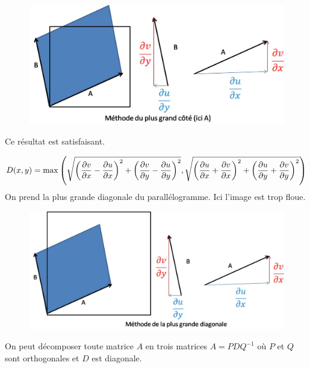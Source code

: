 \begin{figure}[h!]
\centering
\includegraphics[scale=0.5]{methode_plus_grand_cote.jpg}
\end{figure}


Ce résultat est satisfaisant.


$$D(x,y) = \max \left( \sqrt{\left(\frac{\partial v}{\partial x}-\frac{\partial  u}{\partial  x}\right)^2+\left(\frac{\partial v}{\partial y}-\frac{\partial  u}{\partial y}\right)^2}, \sqrt{\left(\frac{\partial u}{\partial x}+\frac{\partial  v}{\partial  x}\right)^2+\left(\frac{\partial u}{\partial y}+\frac{\partial  v}{\partial  y}\right)^2} \right)$$
On prend la plus grande diagonale du parallélogramme. Ici l'image est trop floue.

\begin{figure}[h!]
\centering
\includegraphics[scale=0.5]{methode_grande_diagonale.jpg}
\end{figure}



On peut décomposer toute matrice $A$ en trois matrices $A = PDQ^{-1}$ où $P$ et $Q$ sont orthogonales et $D$ est diagonale.

